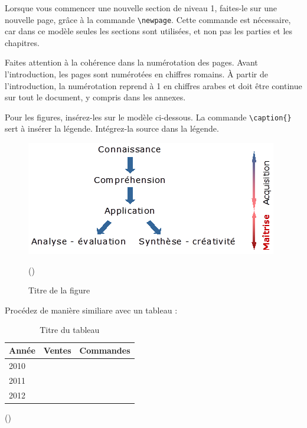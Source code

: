 Lorsque vous commencer une nouvelle section de niveau 1, faites-le sur une nouvelle page, grâce à la commande \verb?\newpage?. Cette commande est nécessaire, car dans ce modèle seules les sections sont utilisées, et non pas les parties et les chapitres.

Faites attention à la cohérence dans la numérotation des pages. Avant l'introduction, les pages sont numérotées en chiffres romains. À partir de l'introduction, la numérotation reprend à 1 en chiffres arabes et doit être continue sur tout le document, y compris dans les annexes.

Pour les figures, insérez-les sur le modèle ci-dessous. La commande \verb?\caption{}? sert à insérer la légende. Intégrez-la source dans la légende.

\begin{figure}[H]
	\noindent \begin{centering}
		\caption{Titre de la figure}
		\bigskip{}
			\includegraphics{images/image3.png}\bigskip{}
	\par \end{centering}
	\noindent \begin{raggedleft}
		(\cite[22]{bertholet_livres_1890}) %
	\par \end{raggedleft}
\end{figure}

Procédez de manière similiare avec un tableau :

\begin{table}[H]
	\noindent \begin{centering}
	\caption{Titre du tableau}
	\bigskip{}
		\begin{tabular}{|m{}|m{}|m{0.4\textwidth}|}
			\hline
			\textbf{Année} & \textbf{Ventes} & \textbf{Commandes} \\
			\hline
			2010 &  &  \\
			\hline
			2011 &  &  \\
			\hline
			2012 & & \\
			\hline
		\end{tabular}
		\bigskip{}
	\par\end{centering}
	\noindent \begin{raggedleft}
		(\cite[22]{bertholet_livres_1890}) %
	\par\end{raggedleft}
\end{table}

